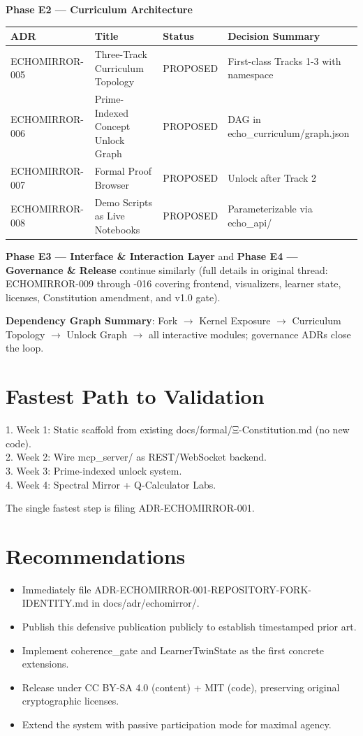 \documentclass[11pt,letterpaper]{article}
\begin{document}
\textbf{Phase E2 — Curriculum Architecture}
\begin{longtable}{l l l p{6cm}}
\toprule
ADR & Title & Status & Decision Summary \\
\midrule
ECHOMIRROR-005 & Three-Track Curriculum Topology & PROPOSED & First-class Tracks 1-3 with namespace \\
ECHOMIRROR-006 & Prime-Indexed Concept Unlock Graph & PROPOSED & DAG in echo\_curriculum/graph.json \\
ECHOMIRROR-007 & Formal Proof Browser & PROPOSED & Unlock after Track 2 \\
ECHOMIRROR-008 & Demo Scripts as Live Notebooks & PROPOSED & Parameterizable via echo\_api/ \\
\bottomrule
\end{longtable}

\textbf{Phase E3 — Interface \& Interaction Layer} and \textbf{Phase E4 — Governance \& Release} continue similarly (full details in original thread: ECHOMIRROR-009 through -016 covering frontend, visualizers, learner state, licenses, Constitution amendment, and v1.0 gate).

\textbf{Dependency Graph Summary}: Fork $\to$ Kernel Exposure $\to$ Curriculum Topology $\to$ Unlock Graph $\to$ all interactive modules; governance ADRs close the loop.

\section{Fastest Path to Validation}
1. Week 1: Static scaffold from existing docs/formal/Ξ-Constitution.md (no new code). \\
2. Week 2: Wire mcp\_server/ as REST/WebSocket backend. \\
3. Week 3: Prime-indexed unlock system. \\
4. Week 4: Spectral Mirror + Q-Calculator Labs.

The single fastest step is filing ADR-ECHOMIRROR-001.

\section{Recommendations}
\begin{itemize}
\item Immediately file ADR-ECHOMIRROR-001-REPOSITORY-FORK-IDENTITY.md in docs/adr/echomirror/.
\item Publish this defensive publication publicly to establish timestamped prior art.
\item Implement coherence\_gate and LearnerTwinState as the first concrete extensions.
\item Release under CC BY-SA 4.0 (content) + MIT (code), preserving original cryptographic licenses.
\item Extend the system with passive participation mode for maximal agency.
\end{itemize}
\end{document}
